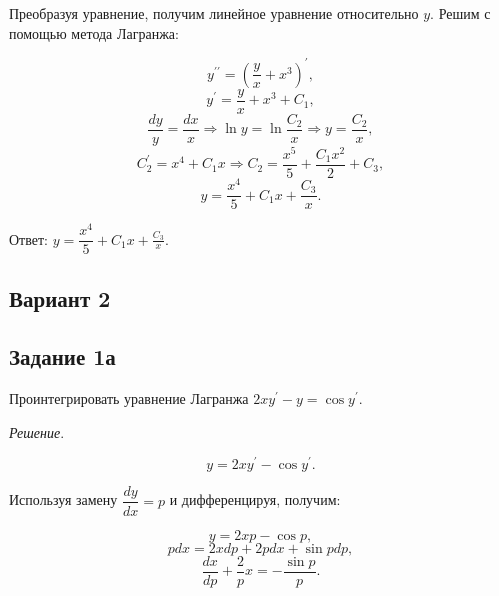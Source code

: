 \documentclass[11pt, a4paper]{article}
\begin{document}
	\par
	Преобразуя уравнение, получим линейное уравнение относительно $y$. Решим с помощью метода Лагранжа:	
	
	\begin{equation*}
    	y^{\prime\prime} = (\dfrac{y}{x} +x^3)^\prime,
	\end{equation*}
	\begin{equation*}
    	y^\prime = \dfrac{y}{x} + x^3 + C_1,
	\end{equation*}
	\begin{equation*}
    	\dfrac{dy}{y} = \dfrac{dx}{x} \Rightarrow \ln{y} = \ln{\dfrac{C_2}{x}} \Rightarrow y = \dfrac{C_2}{x},
	\end{equation*}
	\begin{equation*}
    	C_2^\prime = x^4 + C_1x \Rightarrow  C_2 = \dfrac{x^5}{5} + \dfrac{C_1x^2}{2} + C_3,
	\end{equation*}
	\begin{equation*}
    	y = \dfrac{x^4}{5} + C_1x + \dfrac{C_3}{x}.
	\end{equation*}

	\par\noindent
	Ответ: $y = \dfrac{x^4}{5} + C_1x + \frac{C_3}{x}$.
	
	
	\begin{center}
	\subsection*{Вариант 2}
	\end{center}
	
	\subsection*{Задание 1а}
	
	\par
	Проинтегрировать уравнение Лагранжа $2xy^\prime - y = \cos{y^\prime}$.
	
	\vspace{0.2cm}
	\par
	\textit{Решение}. 
	
	\par
	\begin{equation*}
    	y = 2xy^\prime - \cos{y^\prime}.
	\end{equation*}
	
	\par
	Используя замену $\dfrac{dy}{dx} = p$ и дифференцируя, получим:
	
	\begin{equation}
    	y = 2xp - \cos{p}, \label{eq:4}
	\end{equation}
	\begin{equation*}
    	pdx = 2xdp + 2pdx + \sin{p}dp,
	\end{equation*}
	\begin{equation}
    	\frac{dx}{dp} + \dfrac{2}{p} x = - \dfrac{\sin{p}}{p}.\label{eq:5}
	\end{equation}
	
\end{document}
